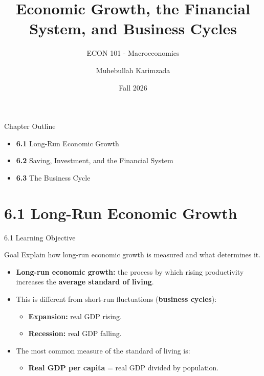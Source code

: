 \documentclass[aspectratio=169]{beamer}
\title{\textbf{Economic Growth, the Financial System, and Business Cycles  \vspace{.5cm}\\  }}
\subtitle{ {\large ECON 101 - Macroeconomics}}
\author{Muhebullah Karimzada}
\date{Fall 2026}
\begin{document}
\begin{frame}[plain]
  \titlepage
\end{frame}

\begin{frame}{Chapter Outline}
\transfade
\begin{itemize}
  \item \textbf{6.1} Long-Run Economic Growth
  \item \textbf{6.2} Saving, Investment, and the Financial System
  \item \textbf{6.3} The Business Cycle
\end{itemize}
\end{frame}

\section{6.1 Long-Run Economic Growth}

\begin{frame}{6.1 Learning Objective}
\transfade
\begin{block}{Goal}
Explain how long-run economic growth is measured and what determines it.
\end{block}
\begin{itemize}
  \item \textbf{Long-run economic growth:} the process by which rising \alert{productivity} increases the \textbf{average standard of living}.
  \item This is different from short-run fluctuations (\textbf{business cycles}):
  \begin{itemize}
    \item \textbf{Expansion:} real GDP rising.
    \item \textbf{Recession:} real GDP falling.
  \end{itemize}
  \item The most common measure of the standard of living is:
  \begin{itemize}
    \item \textbf{Real GDP per capita} = real GDP divided by population.
  \end{itemize}
\end{itemize}
\end{frame}
\end{document}
